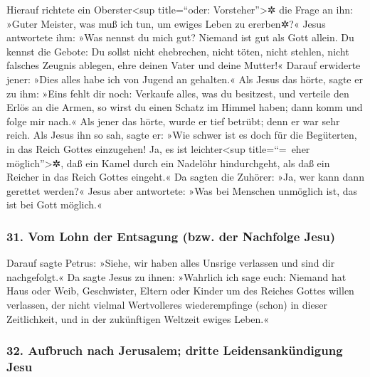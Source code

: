  Hierauf richtete ein Oberster\textless sup title=``oder:
Vorsteher''\textgreater✲ die Frage an ihn: »Guter Meister, was muß ich
tun, um ewiges Leben zu ererben✲?«  Jesus antwortete ihm:
»Was nennst du mich gut? Niemand ist gut als Gott allein.
 Du kennst die Gebote: Du sollst nicht ehebrechen, nicht
töten, nicht stehlen, nicht falsches Zeugnis ablegen, ehre deinen Vater
und deine Mutter!«  Darauf erwiderte jener: »Dies alles
habe ich von Jugend an gehalten.«  Als Jesus das hörte,
sagte er zu ihm: »Eins fehlt dir noch: Verkaufe alles, was du besitzest,
und verteile den Erlös an die Armen, so wirst du einen Schatz im Himmel
haben; dann komm und folge mir nach.«  Als jener das
hörte, wurde er tief betrübt; denn er war sehr reich. 
Als Jesus ihn so sah, sagte er: »Wie schwer ist es doch für die
Begüterten, in das Reich Gottes einzugehen!  Ja, es ist
leichter\textless sup title=``=~eher möglich''\textgreater✲, daß ein
Kamel durch ein Nadelöhr hindurchgeht, als daß ein Reicher in das Reich
Gottes eingeht.«  Da sagten die Zuhörer: »Ja, wer kann
dann gerettet werden?«  Jesus aber antwortete: »Was bei
Menschen unmöglich ist, das ist bei Gott möglich.«

\hypertarget{vom-lohn-der-entsagung-bzw.-der-nachfolge-jesu}{%
\subsubsection{31. Vom Lohn der Entsagung (bzw. der Nachfolge
Jesu)}\label{vom-lohn-der-entsagung-bzw.-der-nachfolge-jesu}}

 Darauf sagte Petrus: »Siehe, wir haben alles Unsrige
verlassen und sind dir nachgefolgt.«  Da sagte Jesus zu
ihnen: »Wahrlich ich sage euch: Niemand hat Haus oder Weib, Geschwister,
Eltern oder Kinder um des Reiches Gottes willen verlassen,
 der nicht vielmal Wertvolleres wiederempfinge (schon) in
dieser Zeitlichkeit, und in der zukünftigen Weltzeit ewiges Leben.«

\hypertarget{aufbruch-nach-jerusalem-dritte-leidensankuxfcndigung-jesu}{%
\subsubsection{32. Aufbruch nach Jerusalem; dritte Leidensankündigung
Jesu}\label{aufbruch-nach-jerusalem-dritte-leidensankuxfcndigung-jesu}}

